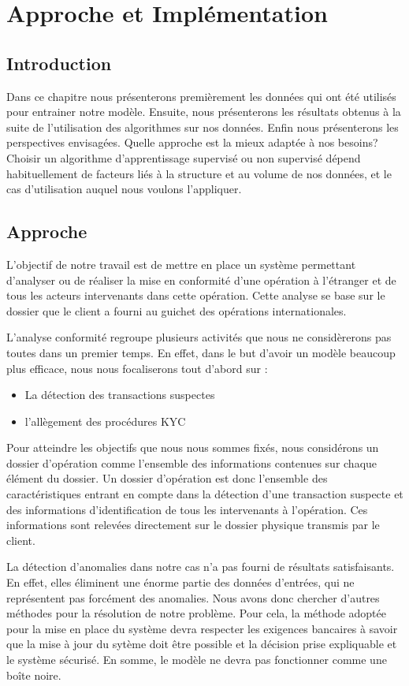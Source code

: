 \chapter{Approche et Implémentation}

\section*{Introduction}
Dans ce chapitre nous présenterons premièrement les données qui ont été utilisés
pour entrainer notre modèle. Ensuite, nous présenterons les résultats obtenus à
la suite de l'utilisation des algorithmes sur nos données. Enfin nous 
présenterons les perspectives envisagées.
Quelle approche est la mieux adaptée à nos besoins? Choisir un algorithme 
d’apprentissage supervisé ou non supervisé dépend habituellement de 
facteurs liés à la structure et au volume de nos données, et le cas 
d’utilisation auquel nous voulons l’appliquer.


\section{Approche}

L'objectif de notre travail est de mettre en place un système permettant 
d'analyser ou de réaliser la mise en conformité d'une opération à l'étranger et
de tous les acteurs intervenants dans cette opération. Cette analyse se base
sur le dossier que le client a fourni au guichet des opérations 
internationales.

L'analyse conformité regroupe plusieurs activités que nous ne considèrerons pas
toutes dans un premier temps. En effet, dans le but d'avoir un modèle
beaucoup plus efficace, nous nous focaliserons tout d'abord sur :
\begin{itemize}
  \item La détection des transactions suspectes
  \item l'allègement des procédures KYC
\end{itemize}
Pour atteindre les objectifs que nous nous sommes fixés, nous considérons un
dossier d'opération comme l'ensemble des informations contenues sur chaque
élément du dossier. Un dossier d'opération est donc l'ensemble des
caractéristiques entrant en compte dans la détection d'une transaction suspecte
et des informations d'identification de tous les intervenants à l'opération.
Ces informations sont relevées directement sur le dossier physique transmis 
par le client.

La détection d'anomalies dans notre cas n'a pas fourni de résultats 
satisfaisants. En effet, elles éliminent une énorme partie des données d'entrées, qui
ne représentent pas forcément des anomalies. Nous avons donc chercher d'autres
méthodes pour la résolution de notre problème.
Pour cela, la méthode adoptée pour la mise en place du système devra respecter les
exigences bancaires à savoir que la mise à jour du sytème doit être 
possible et la décision prise expliquable et le système sécurisé.
En somme, le modèle ne devra pas fonctionner comme une boîte noire.

